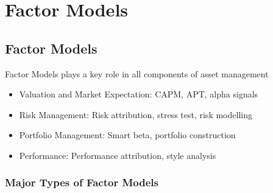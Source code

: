 \documentclass[11pt, openany]{book}              %
\begin{document}
\chapter{Factor Models}

\section{Factor Models}

Factor Models plays a key role in all components of asset management

\begin{itemize}
	\item Valuation and Market Expectation: CAPM, APT, alpha signals
	\item Risk Management: Risk attribution, stress test, risk modelling
	\item Portfolio Management: Smart beta, portfolio construction
	\item Performance: Performance attribution, style analysis
\end{itemize}

\subsection{Major Types of Factor Models}
\end{document}
